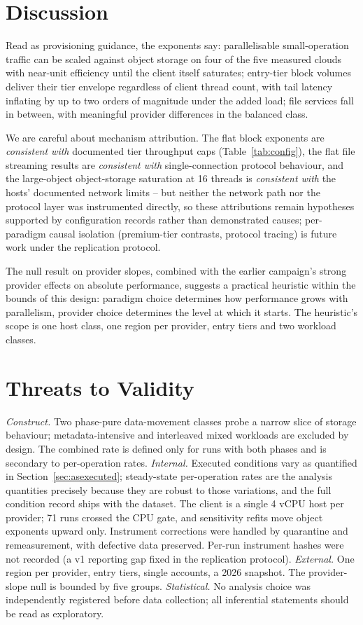 \documentclass[manuscript,screen,review]{acmart}
\begin{document}
\section{Discussion}
Read as provisioning guidance, the exponents say: parallelisable
small-operation traffic can be scaled against object storage on four of the
five measured clouds with near-unit efficiency until the client itself
saturates; entry-tier block volumes deliver their tier envelope regardless of
client thread count, with tail latency inflating by up to two orders of
magnitude under the added load; file services fall in between, with
meaningful provider differences in the balanced class.

We are careful about mechanism attribution. The flat block exponents are
\emph{consistent with} documented tier throughput caps (Table~\ref{tab:config}),
the flat file streaming results are \emph{consistent with} single-connection
protocol behaviour, and the large-object object-storage saturation at 16
threads is \emph{consistent with} the hosts' documented network limits -- but
neither the network path nor the protocol layer was instrumented directly,
so these attributions remain hypotheses supported by configuration records
rather than demonstrated causes; per-paradigm causal isolation (premium-tier
contrasts, protocol tracing) is future work under the replication protocol.

The null result on provider slopes, combined with the earlier campaign's
strong provider effects on absolute performance, suggests a practical
heuristic within the bounds of this design: paradigm choice determines how
performance grows with parallelism, provider choice determines the level at
which it starts. The heuristic's scope is one host class, one region per
provider, entry tiers and two workload classes.

\section{Threats to Validity}
\emph{Construct.} Two phase-pure data-movement classes probe a narrow slice
of storage behaviour; metadata-intensive and interleaved mixed workloads are
excluded by design. The combined rate is defined only for runs with both
phases and is secondary to per-operation rates. \emph{Internal.} Executed
conditions vary as quantified in Section~\ref{sec:asexecuted}; steady-state
per-operation rates are the analysis quantities precisely because they are
robust to those variations, and the full condition record ships with the
dataset. The client is a single 4 vCPU host per provider; 71 runs crossed
the CPU gate, and sensitivity refits move object exponents upward only.
Instrument corrections were handled by quarantine and remeasurement, with
defective data preserved. Per-run instrument hashes were not recorded (a v1
reporting gap fixed in the replication protocol). \emph{External.} One
region per provider, entry tiers, single accounts, a 2026 snapshot. The
provider-slope null is bounded by five groups. \emph{Statistical.} No
analysis choice was independently registered before data collection; all
inferential statements should be read as exploratory.
\end{document}
